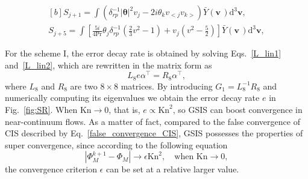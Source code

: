 \begin{equation}\label{L_lin_shcemeII}
\begin{aligned}[b]
S_{j+1}=\int\left({\delta^{-1}_{rp}}{}|\bm{\theta}|^2{v}_j-2i\theta_kv_{<j}v_{k>}\right)\bar{Y}(\bm{{v}}\,)\mathrm{d}^3\bm{{v}}, \\
S_{j+5}=\int\left[\frac{5i}{4\text{Pr}}\theta_j{\delta^{-1}_{rp}}{}\left(\frac{2}{3}{v}^2-1\right)+{v}_j\left({v}^2-\frac{5}{2}\right)\right]\bar{Y}(\bm{{v}}\,)\mathrm{d}^3\bm{{v}},
\end{aligned} 
\end{equation}


For the scheme I, the error decay rate is obtained by solving Eqs.~\eqref{L_lin1} and~\eqref{L_lin2}, which  are rewritten in the matrix form as
\begin{equation}
L_8e\alpha^\top=R_8\alpha^\top,
\end{equation}
where $L_8$ and $R_8$ are two $8\times8$ matrices. By introducing $G_1=L_8^{-1}R_8$ and numerically computing its eigenvalues we obtain the error decay rate $e$ in Fig.~\ref{fig:SR}. When $\text{Kn}\rightarrow0$, that is, $e\propto \text{Kn}^2$, so GSIS can boost convergence in near-continuum flows. As a matter of fact, compared to the false convergence of CIS described by Eq.~\eqref{false_convergence_CIS}, GSIS possesses the properties of super convergence, since according to the following equation
\begin{equation}\label{super_convergence}
|\Phi_M^{k+1}-\Phi_M|\rightarrow{\epsilon}{\text{Kn}^2}, \quad \text{when~}\text{Kn}\rightarrow0,
\end{equation}
the convergence criterion $\epsilon$ can be set at a relative larger value. 

